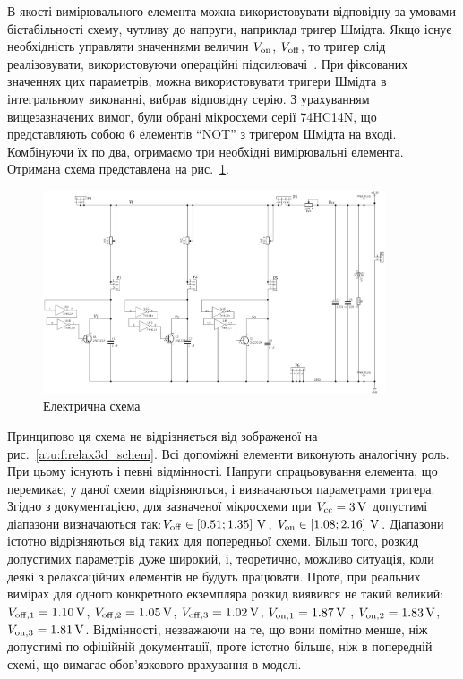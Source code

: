 В якості вимірювального елемента можна використовувати
відповідну за умовами бістабільності схему, чутливу до напруги,
наприклад тригер Шмідта. Якщо існує необхідність управляти
значеннями величин
$V _\mathrm{on} $,
$V _\mathrm{off} $, то тригер слід реалізовувати, використовуючи
операційні підсилювачі~\cite{horowitz}. При фіксованих значеннях
цих параметрів, можна використовувати тригери Шмідта в
інтегральному виконанні, вибрав відповідну серію. З
урахуванням вищезазначених вимог, були обрані мікросхеми
серії 74HC14N, що представляють собою 6 елементів ``NOT'' з тригером
Шмідта на вході. Комбінуючи їх по два, отримаємо три необхідні
вимірювальні елемента. Отримана схема представлена на
рис.~\ref{atu:f:relax3ds_schem}.


\begin{figure}[htb!]
  \centerline{\includegraphics[width=0.9\textwidth]{p/relax3ds_schem.png} }
\caption{Електрична схема \RelaxShIi}
\label{atu:f:relax3ds_schem}
\end{figure}

Принципово ця схема не відрізняється від зображеної
на рис.~\ref{atu:f:relax3d_schem}. Всі допоміжні елементи виконують
аналогічну роль. При цьому існують і певні відмінності. Напруги
спрацьовування  елемента, що перемикає, у даної схеми
відрізняються, і визначаються параметрами тригера. Згідно з
документацією, для зазначеної мікросхеми при
$V _\mathrm{cc} = \SI{3}{\volt} $ допустимі діапазони визначаються так:$ V _\mathrm{off}
\in [0.51; 1.35]~\SI{}{\volt} $,
$V _\mathrm{on} \in [1.08; 2.16]~\SI{}{\volt} $. Діапазони істотно відрізняються
від таких для попередньої схеми. Більш того, розкид допустимих
параметрів дуже широкий, і, теоретично, можливо ситуація, коли
деякі з релаксаційних елементів не будуть працювати. Проте,
при реальних вимірах для одного конкретного екземпляра розкид
виявився не такий великий:
$V _\mathrm{off, 1} = \SI{1.10}{\volt} $,
$V _\mathrm{off, 2} = \SI{1.05}{\volt} $,
$V _\mathrm{off, 3} = \SI{1.02}{\volt} $,
$V _\mathrm{on, 1} = \SI{1.87}{\volt} $ ,
$V _\mathrm{on, 2} = \SI{1.83}{\volt} $,
$V _\mathrm{on, 3} = \SI{1.81}{\volt} $. Відмінності, незважаючи на те, що вони
помітно менше, ніж допустимі по офіційній документації, проте
істотно більше, ніж в попередній схемі, що вимагає обов'язкового
врахування в моделі.

